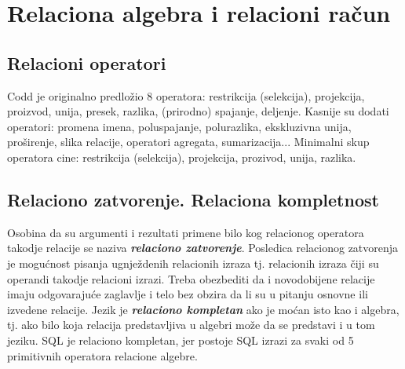 \documentclass{article}
\begin{document}
\newpage

\section{Relaciona algebra i relacioni račun}

\subsection{Relacioni operatori}
Codd je originalno predložio 8 operatora: restrikcija (selekcija),
projekcija, proizvod, unija, presek, razlika, (prirodno) spajanje,
deljenje. \newline
Kasnije su dodati operatori: promena imena, poluspajanje, polurazlika,
ekskluzivna unija, proširenje, slika relacije, operatori agregata,
sumarizacija... \newline
Minimalni skup operatora cine: restrikcija (selekcija), projekcija,
prozivod, unija, razlika.

\subsection{Relaciono zatvorenje. Relaciona kompletnost}
Osobina da su argumenti i rezultati primene bilo kog relacionog
operatora takodje relacije se naziva \textbf{\textit{relaciono
zatvorenje}}. Posledica relacionog zatvorenja je mogućnost pisanja
ugnježdenih relacionih izraza tj. relacionih izraza čiji su operandi
takodje relacioni izrazi. Treba obezbediti da i novodobijene relacije
imaju odgovarajuće zaglavlje i telo bez obzira da li su  u pitanju 
osnovne ili izvedene relacije.
\newline
Jezik je \textbf{\textit{relaciono kompletan}} ako je moćan isto kao i
algebra, tj. ako bilo koja relacija predstavljiva u algebri može da se
predstavi i u tom jeziku. 
\newline
SQL je relaciono kompletan, jer postoje SQL izrazi
za svaki od 5 primitivnih operatora relacione algebre.
\end{document}
